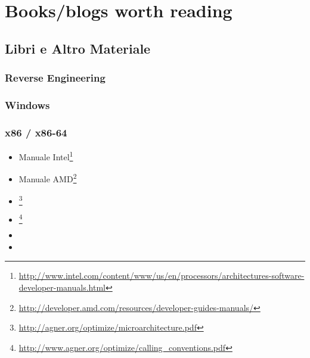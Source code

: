 \chapter{Books/blogs worth reading}

\section{Libri e Altro Materiale}

\subsection{Reverse Engineering}




\subsection{Windows}



\subsection{\CCpp}



\subsection{x86 / x86-64}

\label{x86_manuals}
\begin{itemize}
\item Manuale Intel\footnote{\AlsoAvailableAs \url{http://www.intel.com/content/www/us/en/processors/architectures-software-developer-manuals.html}}

\item Manuale AMD\footnote{\AlsoAvailableAs \url{http://developer.amd.com/resources/developer-guides-manuals/}}

\item \AgnerFog{}\footnote{\AlsoAvailableAs \url{http://agner.org/optimize/microarchitecture.pdf}}

\item \AgnerFogCC{}\footnote{\AlsoAvailableAs \url{http://www.agner.org/optimize/calling_conventions.pdf}}

\item \IntelOptimization

\item \AMDOptimization
\end{itemize}

